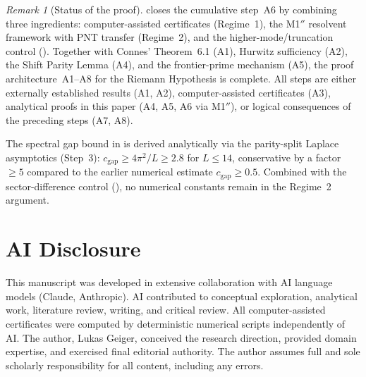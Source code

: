 \documentclass[12pt,a4paper]{article}
\theoremstyle{definition}
\theoremstyle{remark}
\newtheorem{remark}[theorem]{Remark}
\begin{document}
\begin{remark}[Status of the proof]
\label{rem:M1-status}
 closes the cumulative step~A6 by combining three ingredients: computer-assisted certificates (Regime~1), the M1$''$ resolvent framework with PNT transfer (Regime~2), and the higher-mode/truncation control (). Together with Connes' Theorem~6.1 (A1), Hurwitz sufficiency (A2), the Shift Parity Lemma (A4), and the frontier-prime mechanism (A5), the proof architecture~A1--A8 for the Riemann Hypothesis is complete. All steps are either externally established results (A1, A2), computer-assisted certificates (A3), analytical proofs in this paper (A4, A5, A6 via M1$''$), or logical consequences of the preceding steps (A7, A8).

The spectral gap bound in  is derived analytically via the parity-split Laplace asymptotics (Step~3): $c_{\mathrm{gap}} \geq 4\pi^2/L \geq 2.8$ for $L \leq 14$, conservative by a factor $\geq 5$ compared to the earlier numerical estimate $c_{\mathrm{gap}} \geq 0.5$. Combined with the sector-difference control (), no numerical constants remain in the Regime~2 argument.
\end{remark}


\section*{AI Disclosure}

This manuscript was developed in extensive collaboration with AI language models (Claude, Anthropic). AI contributed to conceptual exploration, analytical work, literature review, writing, and critical review. All computer-assisted certificates were computed by deterministic numerical scripts independently of AI. The author, Lukas Geiger, conceived the research direction, provided domain expertise, and exercised final editorial authority. The author assumes full and sole scholarly responsibility for all content, including any errors.




\end{document}
